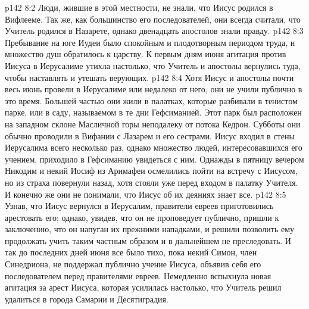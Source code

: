 \vs p142 8:2 Люди, жившие в этой местности, не знали, что Иисус родился в Вифлееме. Так же, как большинство его последователей, они всегда считали, что Учитель родился в Назарете, однако двенадцать апостолов знали правду.
\vs p142 8:3 Пребывание на юге Иудеи было спокойным и плодотворным периодом труда, и множество душ обратилось к царству. К первым дням июня агитация против Иисуса в Иерусалиме утихла настолько, что Учитель и апостолы вернулись туда, чтобы наставлять и утешать верующих.
\vs p142 8:4 Хотя Иисус и апостолы почти весь июнь провели в Иерусалиме или недалеко от него, они не учили публично в это время. Большей частью они жили в палатках, которые разбивали в тенистом парке, или в саду, называемом в те дни Гефсиманией. Этот парк был расположен на западном склоне Масличной горы неподалеку от потока Кедрон. Субботы они обычно проводили в Вифании с Лазарем и его сестрами. Иисус входил в стены Иерусалима всего несколько раз, однако множество людей, интересовавшихся его учением, приходило в Гефсиманию увидеться с ним. Однажды в пятницу вечером Никодим и некий Иосиф из Аримафеи осмелились пойти на встречу с Иисусом, но из страха повернули назад, хотя стояли уже перед входом в палатку Учителя. И конечно же они не понимали, что Иисус об их деяниях знает все.
\vs p142 8:5 Узнав, что Иисус вернулся в Иерусалим, правители евреев приготовились арестовать его; однако, увидев, что он не проповедует публично, пришли к заключению, что он напуган их прежними нападками, и решили позволить ему продолжать учить таким частным образом и в дальнейшем не преследовать. И так до последних дней июня все было тихо, пока некий Симон, член Синедриона, не поддержал публично учение Иисуса, объявив себя его последователем перед правителями евреев. Немедленно вспыхнула новая агитация за арест Иисуса, которая усилилась настолько, что Учитель решил удалиться в города Самарии и Десятиградия.
